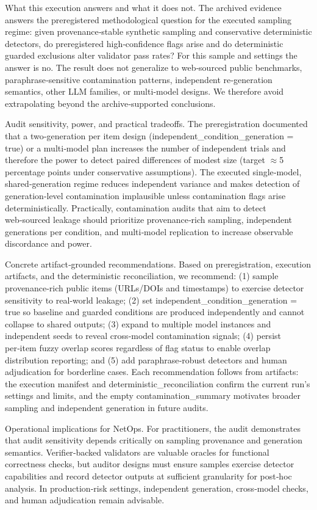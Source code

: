 \documentclass[conference]{IEEEtran}
\begin{document}
What this execution answers and what it does not. The archived evidence answers the preregistered methodological question for the executed sampling regime: given provenance‑stable synthetic sampling and conservative deterministic detectors, do preregistered high‑confidence flags arise and do deterministic guarded exclusions alter validator pass rates? For this sample and settings the answer is no. The result does not generalize to web‑sourced public benchmarks, paraphrase‑sensitive contamination patterns, independent re‑generation semantics, other LLM families, or multi‑model designs. We therefore avoid extrapolating beyond the archive‑supported conclusions.

Audit sensitivity, power, and practical tradeoffs. The preregistration documented that a two‑generation per item design (independent\_condition\_generation = true) or a multi‑model plan increases the number of independent trials and therefore the power to detect paired differences of modest size (target \ensuremath{\approx}5 percentage points under conservative assumptions). The executed single‑model, shared‑generation regime reduces independent variance and makes detection of generation‑level contamination implausible unless contamination flags arise deterministically. Practically, contamination audits that aim to detect web‑sourced leakage should prioritize provenance‑rich sampling, independent generations per condition, and multi‑model replication to increase observable discordance and power.

Concrete artifact‑grounded recommendations. Based on preregistration, execution artifacts, and the deterministic reconciliation, we recommend: (1) sample provenance‑rich public items (URLs/DOIs and timestamps) to exercise detector sensitivity to real‑world leakage; (2) set independent\_condition\_generation = true so baseline and guarded conditions are produced independently and cannot collapse to shared outputs; (3) expand to multiple model instances and independent seeds to reveal cross‑model contamination signals; (4) persist per‑item fuzzy overlap scores regardless of flag status to enable overlap distribution reporting; and (5) add paraphrase‑robust detectors and human adjudication for borderline cases. Each recommendation follows from artifacts: the execution manifest and deterministic\_reconciliation confirm the current run's settings and limits, and the empty contamination\_summary motivates broader sampling and independent generation in future audits.

Operational implications for NetOps. For practitioners, the audit demonstrates that audit sensitivity depends critically on sampling provenance and generation semantics. Verifier‑backed validators are valuable oracles for functional correctness checks, but auditor designs must ensure samples exercise detector capabilities and record detector outputs at sufficient granularity for post‑hoc analysis. In production‑risk settings, independent generation, cross‑model checks, and human adjudication remain advisable.
\end{document}
